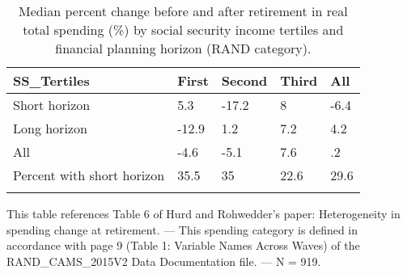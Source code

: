 \begin{table}[tbp] \centering
{}

\caption{Median percent change before and after retirement in real total spending (\%) by social security income tertiles and financial planning horizon (RAND category).}
\begin{tabularx}{\textwidth}{lCCCC}

\toprule
{SS\_Tertiles}&{First}&{Second}&{Third}&{All} \tabularnewline
\midrule\addlinespace[1.5ex]
Short horizon&5.3&-17.2&8&-6.4 \tabularnewline
Long horizon&-12.9&1.2&7.2&4.2 \tabularnewline
All&-4.6&-5.1&7.6&.2 \tabularnewline
Percent with short horizon&35.5&35&22.6&29.6 \tabularnewline
\bottomrule \addlinespace[1.5ex]

\end{tabularx}
\begin{flushleft}
\footnotesize This table references Table 6 of Hurd and Rohwedder's paper: Heterogeneity in spending change at retirement. \linebreak --- \linebreak This spending category is defined in accordance with page 9 (Table 1: Variable Names Across Waves) of the RAND\_CAMS\_2015V2 Data Documentation file. \linebreak --- \linebreak N = 919.
\end{flushleft}
\end{table}
